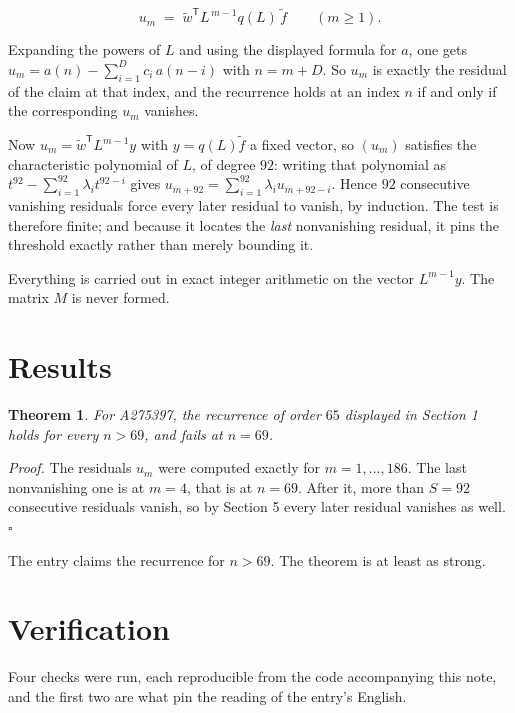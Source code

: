 \documentclass[11pt]{article}
\newtheorem{theorem}{Theorem}
\theoremstyle{definition}
\begin{document}
\[u_m \;=\; \tilde w^{\mathsf T} L^{\,m-1} q(L)\,\tilde f \qquad (m \ge 1).\]

Expanding the powers of $L$ and using the displayed formula for $a$, one gets $u_m = a(n) - \sum_{i=1}^{D} c_i\,a(n-i)$ with $n = m + D$. So $u_m$ is exactly the residual of the claim at that index, and the recurrence holds at an index $n$ if and only if the corresponding $u_m$ vanishes.

Now $u_m = \tilde w^{\mathsf T} L^{m-1} y$ with $y = q(L)\tilde f$ a fixed vector, so $(u_m)$ satisfies the characteristic polynomial of $L$, of degree $92$: writing that polynomial as $t^{92} - \sum_{i=1}^{92} \lambda_i t^{92-i}$ gives $u_{m+92} = \sum_{i=1}^{92} \lambda_i u_{m+92-i}$. Hence $92$ consecutive vanishing residuals force every later residual to vanish, by induction. The test is therefore finite; and because it locates the {\itshape last} nonvanishing residual, it pins the threshold exactly rather than merely bounding it.

Everything is carried out in exact integer arithmetic on the vector $L^{m-1}y$. The matrix $M$ is never formed.

\section{Results}

\begin{theorem} For A275397, the recurrence of order $65$ displayed in Section 1 holds for every $n > 69$, and fails at $n = 69$.\end{theorem}

{\itshape Proof.} The residuals $u_m$ were computed exactly for $m = 1,\dots,186$. The last nonvanishing one is at $m = 4$, that is at $n = 69$. After it, more than $S = 92$ consecutive residuals vanish, so by Section 5 every later residual vanishes as well. $\square$

The entry claims the recurrence for $n > 69$. The theorem is at least as strong.

\section{Verification}

Four checks were run, each reproducible from the code accompanying this note, and the first two are what pin the reading of the entry's English.
\end{document}
